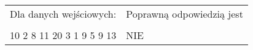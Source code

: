 \documentclass[
  fontsize=12pt  %
 ,english        %
 ,headinclude    %
 ,headsepline    %
]{scrbook}       %
\begin{document}
\\
\begin{tabular}{ p{7cm} p{7cm} }

  Dla danych wejściowych: \hspace{40mm}& Poprawną odpowiedzią jest \\
& \\

10 2 \newline
9 8 11 20 3 1 9 5 9 13 \newline

&   
NIE
\\

\end{tabular}
\end{document}
